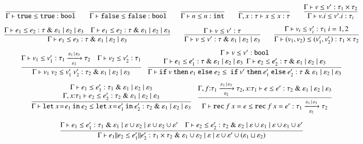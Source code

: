 \documentclass[nocopyrightspace,preprint]{sigplanconf}
\newcommand{\keywd}[1]{\mathtt{#1}}
\newcommand{\myeffto}[3]{\xrightarrow[#2]{#1\,\mid\, #3}}
\newcommand{\mtrue}{\keywd{true}}
\newcommand{\mfalse}{\keywd{false}}
\newcommand{\inttype}{\keywd{int}}
\newcommand{\booltype}{\keywd{bool}}
\newcommand{\vfix}[3]{\keywd{rec}\:{#1}\:{#2} = {#3}}
\newcommand{\letin}[2]{\keywd{let}\:{#1}\!=\!{#2}\:\keywd{in}\:}
\newcommand{\myif}[3]{\keywd{if}\ #1\ \keywd{then}\ #2\
  \keywd{else}\ #3}
\newcommand{\mypar}[2]{#1 \| #2}
\newcommand{\eff}{\varepsilon}
\newcommand{\myety}[4]{{#1}\mathrel{\&}{#2} \mid #3 \mid #4}
\newcommand{\valty}[1]{#1}
\begin{document}
\begin{figure*}[t]
\vspace{-3mm}
 \[
\infer{\Gamma\vdash \mtrue\leq\mtrue : \valty{\booltype}}{}
\qquad
\infer{\Gamma\vdash \mfalse\leq\mfalse : \valty{\booltype}}{}
\qquad 
\infer{\Gamma\vdash n\leq n : \valty{\inttype}}{}
\qquad
\infer{\Gamma,x:\tau\vdash x\leq x : \valty{\tau}}{}
\qquad 
\infer{\Gamma\vdash v.i\leq v'.i:\valty{\tau_i}}{\Gamma\vdash
v\leq v':\valty{\tau_1\times\tau_2}}
\]
\[
\infer{\Gamma\vdash e_1\leq e_3:\myety{\tau}{\eff_1}{\eff_2}{\eff_3}}{\Gamma\vdash e_1\leq e_2:\myety{\tau}{\eff_1}{\eff_2}{\eff_3}\quad
\Gamma\vdash e_1\leq e_2:\myety{\tau}{\eff_1}{\eff_2}{\eff_3}
}
\qquad
\infer{\Gamma\vdash v\leq v':\myety{\tau}{\eff_1}{\eff_2}{\eff_3}}{\Gamma\vdash v\leq v':\valty{\tau}}
\qquad
\infer{\Gamma\vdash
(v_1,v_2)\leq(v_1',v_2') :\valty{\tau_1\times\tau_2}}
{\Gamma\vdash v_i\leq v_i':\valty{\tau_1}\mbox{ $i=1,2$}}
\]
\[
\infer{\Gamma\vdash v_1\ v_2\leq v_1'\ v_2' : \myety{\tau_2}{\eff_1}{\eff_2}{\eff_3}}
{\Gamma\vdash v_1\leq v_1':\valty{\tau_1\myeffto{\eff_1}{\eff_2}{\eff_3}\tau_2} & \Gamma\vdash
v_2\leq v_2':\valty{\tau_1}}\quad 
 \infer{\Gamma\vdash
\myif{v}{e_1}{e_2}\leq \ \myif{v'}{e_1'}{e_2'}
   : \myety{\tau}{\eff_1}{\eff_2}{\eff_3}}
{\begin{array}{c}
\Gamma\vdash v\leq v':\valty{\booltype} \\ \Gamma\vdash e_1\leq e_1':\myety{\tau}{\eff_1}{\eff_2}{\eff_3}\ \ 
    \Gamma\vdash e_2\leq e_2':\myety{\tau}{\eff_1}{\eff_2}{\eff_3}
  \end{array}
}
\]\[
\infer{\Gamma\vdash \letin{x}{e_1}{e_2}\leq \letin{x}{e_1'}{e_2'} :\myety{\tau_2}{\eff_1}{\eff_2}{\eff_3}}
{\begin{array}{c}\Gamma\vdash 
e_1\leq e_1':\myety{\tau_1}{\eff_1}{\eff_2}{\eff_3}\\
  \Gamma,x{:}\tau_1\vdash e_2\leq e_2':\myety{\tau_2}{\eff_1}{\eff_2}{\eff_3}
  \end{array}
}
\quad
\infer{\Gamma\vdash \vfix{f}{x}{e}\leq\vfix{f}{x}{e'}  : \valty{\tau_1\myeffto{\eff_1}{\eff_2}{\eff_3} \tau_2}}
{\Gamma,f{:}\tau_1\myeffto{\eff_1}{\eff_2}{\eff_3} \tau_2,x{:}\tau_1\vdash
e\leq e':\myety{\tau_2}{\eff_1}{\eff_2}{\eff_3}}
\]

\[
 \infer{\Gamma \vdash \mypar{e_1}{e_2} \leq \mypar{e_1'}{e_2'} : \myety{\tau_1 \times \tau_2}{\eff_1 \cup \eff_2}{\eff}{\eff \cup \eff' \cup (\eff_1 \sqcup \eff_2)}}
{\Gamma \vdash e_1 \leq e_1' : 
  \myety{\tau_1}{\eff_1}{\eff \cup \eff_2}{\eff \cup \eff_2 \cup \eff'}\quad \Gamma \vdash e_2 \leq e_2' : 
  \myety{\tau_2}{\eff_2}{\eff \cup \eff_1}{\eff \cup \eff_1 \cup \eff'}}
 \]


\end{figure*}
\end{document}

